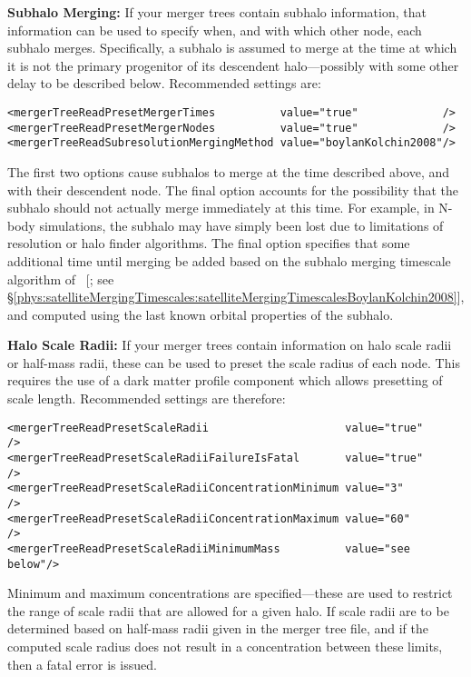 {\bf Subhalo Merging:} If your merger trees contain subhalo information, that information can be used to specify when, and with which other node, each subhalo merges. Specifically, a subhalo is assumed to merge at the time at which it is not the primary progenitor of its descendent halo---possibly with some other delay to be described below. Recommended settings are:
\begin{verbatim}
<mergerTreeReadPresetMergerTimes          value="true"             />
<mergerTreeReadPresetMergerNodes          value="true"             />
<mergerTreeReadSubresolutionMergingMethod value="boylanKolchin2008"/>
\end{verbatim}
The first two options cause subhalos to merge at the time described above, and with their descendent node. The final option accounts for the possibility that the subhalo should not actually merge immediately at this time. For example, in N-body simulations, the subhalo may have simply been lost due to limitations of resolution or halo finder algorithms. The final option specifies that some additional time until merging be added based on the subhalo merging timescale algorithm of \citeauthor{boylan-kolchin_dynamical_2008}~[\citeyear{boylan-kolchin_dynamical_2008}; see \S\ref{phys:satelliteMergingTimescales:satelliteMergingTimescalesBoylanKolchin2008}], and computed using the last known orbital properties of the subhalo.

{\bf Halo Scale Radii:} If your merger trees contain information on halo scale radii or half-mass radii, these can be used to preset the scale radius of each \gls{node}. This requires the use of a dark matter profile component which allows presetting of scale length. Recommended settings are therefore:
\begin{verbatim}
<mergerTreeReadPresetScaleRadii                     value="true"     />
<mergerTreeReadPresetScaleRadiiFailureIsFatal       value="true"     />
<mergerTreeReadPresetScaleRadiiConcentrationMinimum value="3"        />
<mergerTreeReadPresetScaleRadiiConcentrationMaximum value="60"       />
<mergerTreeReadPresetScaleRadiiMinimumMass          value="see below"/>
\end{verbatim}
Minimum and maximum concentrations are specified---these are used to restrict the range of scale radii that are allowed for a given halo. If scale radii are to be determined based on half-mass radii given in the merger tree file, and if the computed scale radius does not result in a concentration between these limits, then a fatal error is issued.

